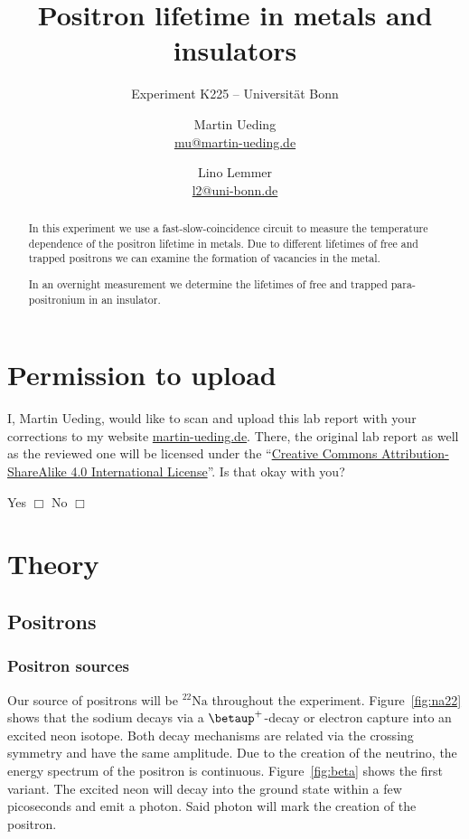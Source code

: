 \documentclass[11pt, english, fleqn, DIV=15, headinclude, BCOR=2cm]{scrreprt}
\title{Positron lifetime in metals and insulators}
\subtitle{Experiment K225 -- Universität Bonn}
\author{%
    Martin Ueding \\
    \small{\href{mailto:mu@martin-ueding.de}{mu@martin-ueding.de}}
    \and
    Lino Lemmer \\
    \small{\href{mailto:l2@uni-bonn.de}{l2@uni-bonn.de}}
}
\date{\daterange{2016-03-24}{2016-03-25}}
\begin{document}
\maketitle

\begin{abstract}
        In this experiment we use a fast-slow-coincidence circuit to measure
        the temperature dependence of the positron lifetime in metals. Due to
        different lifetimes of free and trapped positrons we can examine the
        formation of vacancies in the metal. 
        
        In an overnight measurement we determine the lifetimes of free and
        trapped para-positronium in an insulator. 
\end{abstract}

\tableofcontents

\chapter*{Permission to upload}

I, Martin Ueding, would like to scan and upload this lab report with your
corrections to my website \href{http://martin-ueding.de}{martin-ueding.de}.
There, the original lab report as well as the reviewed one will be licensed
under the “\href{http://creativecommons.org/licenses/by-sa/4.0/}{Creative
Commons Attribution-ShareAlike 4.0 International License}”. Is that okay with
you?

Yes $\Box$ \hspace{2cm} No $\Box$

\chapter{Theory}

\section{Positrons}

\subsection{Positron sources}

Our source of positrons will be $\mathrm{^{22}Na}$ throughout the experiment.
Figure~\ref{fig:na22} shows that the sodium decays via a $\betaup^+$-decay or
electron capture into an excited neon isotope. Both decay mechanisms are
related via the crossing symmetry and have the same amplitude. Due to the
creation of the neutrino, the energy spectrum of the positron is continuous.
Figure~\ref{fig:beta} shows the first variant. The excited neon will decay
into the ground state within a few picoseconds and emit a photon. Said photon
will mark the creation of the positron.
\end{document}
